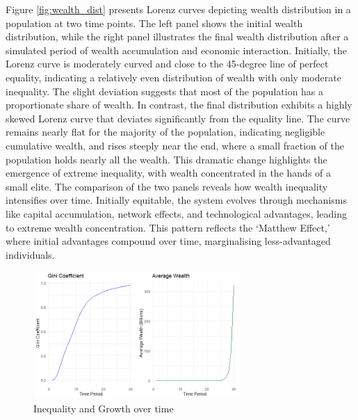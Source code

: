 \documentclass[12pt]{article}
\begin{document}
Figure \ref{fig:wealth_dist} presents Lorenz curves depicting wealth distribution in a population at two time points. The left panel shows the initial wealth distribution, while the right panel illustrates the final wealth distribution after a simulated period of wealth accumulation and economic interaction. Initially, the Lorenz curve is moderately curved and close to the 45-degree line of perfect equality, indicating a relatively even distribution of wealth with only moderate inequality. The slight deviation suggests that most of the population has a proportionate share of wealth. In contrast, the final distribution exhibits a highly skewed Lorenz curve that deviates significantly from the equality line. The curve remains nearly flat for the majority of the population, indicating negligible cumulative wealth, and rises steeply near the end, where a small fraction of the population holds nearly all the wealth. This dramatic change highlights the emergence of extreme inequality, with wealth concentrated in the hands of a small elite. The comparison of the two panels reveals how wealth inequality intensifies over time. Initially equitable, the system evolves through mechanisms like capital accumulation, network effects, and technological advantages, leading to extreme wealth concentration. This pattern reflects the `Matthew Effect,' where initial advantages compound over time, marginalising less-advantaged individuals.


\begin{figure}[H]
    \centering
    \includegraphics[width=0.7\textwidth]{gini_wealth.png}
    \caption{Inequality and Growth over time}
    \label{fig:gini_wealth}
\end{figure}
\end{document}
